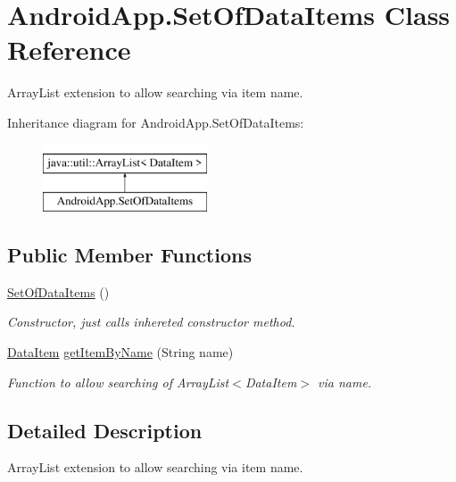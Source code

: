 \hypertarget{class_android_app_1_1_set_of_data_items}{}\section{Android\+App.\+Set\+Of\+Data\+Items Class Reference}
\label{class_android_app_1_1_set_of_data_items}


Array\+List extension to allow searching via item name.  


Inheritance diagram for Android\+App.\+Set\+Of\+Data\+Items\+:\begin{figure}[H]
\begin{center}
\leavevmode
\includegraphics[height=2.000000cm]{class_android_app_1_1_set_of_data_items}
\end{center}
\end{figure}
\subsection*{Public Member Functions}
\begin{DoxyCompactItemize}
\item 
\mbox{\label{class_android_app_1_1_set_of_data_items_a719c4dffae070925492a8cca986a8337}} 
\hyperlink{class_android_app_1_1_set_of_data_items_a719c4dffae070925492a8cca986a8337}{Set\+Of\+Data\+Items} ()
\begin{DoxyCompactList}\small\item\em Constructor, just calls inhereted constructor method. \end{DoxyCompactList}\item 
\hyperlink{class_android_app_1_1_data_item}{Data\+Item} \hyperlink{class_android_app_1_1_set_of_data_items_aa559ef3701bb9f59f124ddddc56a2a38}{get\+Item\+By\+Name} (String name)
\begin{DoxyCompactList}\small\item\em Function to allow searching of Array\+List$<$\+Data\+Item$>$ via name. \end{DoxyCompactList}\end{DoxyCompactItemize}


\subsection{Detailed Description}
Array\+List extension to allow searching via item name. 

